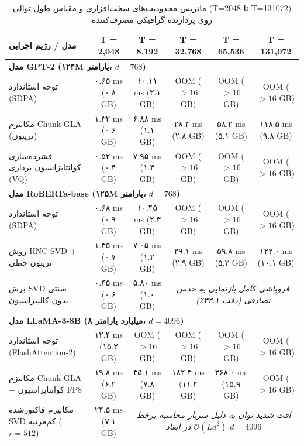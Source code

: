\documentclass[12pt,a4paper]{report}
\theoremstyle{definition}
\begin{document}
\begin{table}[H]
\centering
\caption{ماتریس محدودیت‌های سخت‌افزاری و مقیاس طول توالی (T=2048 تا T=131072) روی پردازنده گرافیکی مصرف‌کننده}
\label{tab:hardware_limits_matrix_persian}
\scriptsize
\setlength{\tabcolsep}{4.5pt}
\begin{tabular}{lccccc}
\toprule
\textbf{مدل / رژیم اجرایی} & \textbf{T = 2,048} & \textbf{T = 8,192} & \textbf{T = 32,768} & \textbf{T = 65,536} & \textbf{T = 131,072} \\
\midrule
\multicolumn{6}{l}{\textbf{مدل GPT-2 (۱۲۴M پارامتر، $d=768$)}} \\
توجه استاندارد (SDPA) & ۰.۶۵ ms (۰.۸ GB) & ۱۰.۱۱ ms (۲.۱ GB) & OOM ($>16$ GB) & OOM ($>16$ GB) & OOM ($>16$ GB) \\
مکانیزم Chunk GLA (تریتون) & ۱.۳۲ ms (۰.۶ GB) & ۶.۸۸ ms (۱.۱ GB) & ۲۸.۴ ms (۲.۸ GB) & ۵۸.۲ ms (۵.۱ GB) & ۱۱۸.۵ ms (۹.۸ GB) \\
فشرده‌سازی کوانتایزاسیون برداری (VQ) & ۰.۵۲ ms (۰.۴ GB) & ۷.۹۵ ms (۱.۴ GB) & OOM ($>16$ GB) & OOM ($>16$ GB) & OOM ($>16$ GB) \\
\midrule
\multicolumn{6}{l}{\textbf{مدل RoBERTa-base (۱۲۵M پارامتر، $d=768$)}} \\
توجه استاندارد (SDPA) & ۰.۶۸ ms (۰.۹ GB) & ۱۰.۴۵ ms (۲.۳ GB) & OOM ($>16$ GB) & OOM ($>16$ GB) & OOM ($>16$ GB) \\
روش HNC-SVD + تریتون خطی & ۱.۳۵ ms (۰.۷ GB) & ۷.۰۵ ms (۱.۲ GB) & ۲۹.۱ ms (۲.۹ GB) & ۵۹.۸ ms (۵.۳ GB) & ۱۲۲.۰ ms (۱۰.۱ GB) \\
برش SVD سنتی بدون کالیبراسیون & ۰.۴۵ ms (۰.۶ GB) & ۵.۸۰ ms (۱.۰ GB) & \multicolumn{3}{c}{\textit{فروپاشی کامل بازنمایی به حدس تصادفی (دقت ۳۴.۱٪)}} \\
\midrule
\multicolumn{6}{l}{\textbf{مدل LLaMA-3-8B (۸ میلیارد پارامتر، $d=4096$)}} \\
توجه استاندارد (FlashAttention-2) & ۱۲.۴ ms (۱۵.۲ GB) & OOM ($>16$ GB) & OOM ($>16$ GB) & OOM ($>16$ GB) & OOM ($>16$ GB) \\
مکانیزم Chunk GLA + کوانتایزاسیون FP8 & ۱۹.۸ ms (۶.۲ GB) & ۴۵.۱ ms (۷.۸ GB) & ۱۸۲.۴ ms (۱۱.۴ GB) & ۳۶۸.۰ ms (۱۵.۹ GB) & OOM ($>16$ GB) \\
مکانیزم فاکتورشده SVD کم‌مرتبه ($r=512$) & ۲۴.۵ ms (۷.۱ GB) & \multicolumn{4}{c}{\textit{افت شدید توان به دلیل سربار محاسبه برخط $\mathcal{O}(L d^2)$ در ابعاد $d=4096$}} \\
\bottomrule
\end{tabular}
\end{table}
\end{document}
